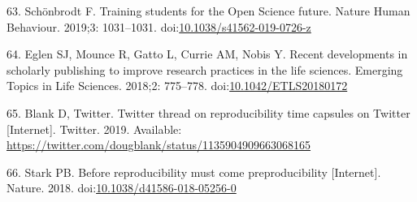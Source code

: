 \documentclass[10pt,letterpaper]{article}
\begin{document}
\leavevmode\hypertarget{ref-schonbrodt_training_2019}{}%
63. Schönbrodt F. Training students for the Open Science future. Nature
Human Behaviour. 2019;3: 1031--1031.
doi:\href{https://doi.org/10.1038/s41562-019-0726-z}{10.1038/s41562-019-0726-z}

\leavevmode\hypertarget{ref-eglen_recent_2018}{}%
64. Eglen SJ, Mounce R, Gatto L, Currie AM, Nobis Y. Recent developments
in scholarly publishing to improve research practices in the life
sciences. Emerging Topics in Life Sciences. 2018;2: 775--778.
doi:\href{https://doi.org/10.1042/ETLS20180172}{10.1042/ETLS20180172}

\leavevmode\hypertarget{ref-blank_twitter_2019}{}%
65. Blank D, Twitter. Twitter thread on reproducibility time capsules on
Twitter {[}Internet{]}. Twitter. 2019. Available:
\url{https://twitter.com/dougblank/status/1135904909663068165}

\leavevmode\hypertarget{ref-stark_before_2018}{}%
66. Stark PB. Before reproducibility must come preproducibility
{[}Internet{]}. Nature. 2018.
doi:\href{https://doi.org/10.1038/d41586-018-05256-0}{10.1038/d41586-018-05256-0}

\nolinenumbers
\end{document}
